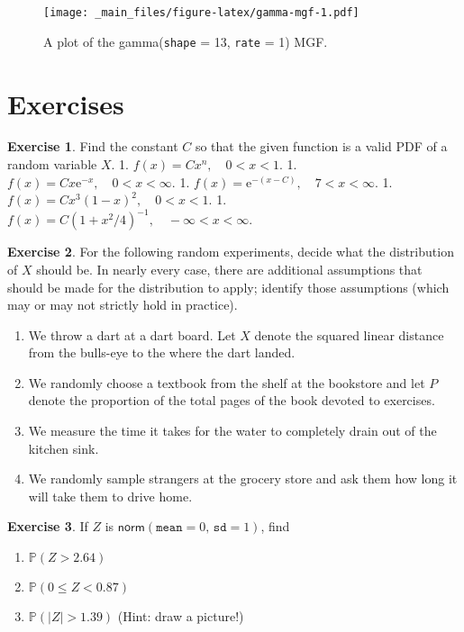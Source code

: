 \documentclass[]{book}
\providecommand{\tightlist}{%
  \setlength{\itemsep}{0pt}\setlength{\parskip}{0pt}}
\numberwithin{equation}{chapter}
\numberwithin{figure}{chapter}
\theoremstyle{plain}
\theoremstyle{definition}
\newtheorem{xca}{Exercise}[chapter]
\theoremstyle{remark}
\theoremstyle{definition}
\theoremstyle{definition}
\theoremstyle{remark}
\begin{document}
\begin{figure}[htbp]
\centering
\texttt{[image: \_main\_files/figure-latex/gamma-mgf-1.pdf]}
\caption{\label{fig:gamma-mgf}\small A plot of the \textsf{gamma}(\texttt{shape} =
13, \texttt{rate} = 1) MGF.}
\end{figure}




\section{Exercises}\label{exercises-4}

\begin{xca}
Find the constant \(C\) so that the given function is a valid PDF of a
random variable \(X\). 1. \(f(x) = Cx^{n},\quad 0 < x <1\). 1.
\(f(x) = Cx\mathrm{e}^{-x},\quad 0 < x < \infty\). 1.
\(f(x) = \mathrm{e}^{-(x - C)}, \quad 7 < x < \infty.\) 1.
\(f(x) = Cx^{3}(1 - x)^{2},\quad 0 < x < 1.\) 1.
\(f(x) = C(1 + x^{2}/4)^{-1}, \quad -\infty < x < \infty.\)
\end{xca}

\bigskip

\begin{xca}
For the following random experiments, decide what the distribution of
\(X\) should be. In nearly every case, there are additional assumptions
that should be made for the distribution to apply; identify those
assumptions (which may or may not strictly hold in practice).

\begin{enumerate}
\def\labelenumi{\arabic{enumi}.}
\tightlist
\item
  We throw a dart at a dart board. Let \(X\) denote the squared linear
  distance from the bulls-eye to the where the dart landed.
\item
  We randomly choose a textbook from the shelf at the bookstore and let
  \(P\) denote the proportion of the total pages of the book devoted to
  exercises.
\item
  We measure the time it takes for the water to completely drain out of
  the kitchen sink.
\item
  We randomly sample strangers at the grocery store and ask them how
  long it will take them to drive home.
\end{enumerate}
\end{xca}

\bigskip

\begin{xca}
If \(Z\) is \(\mathsf{norm}(\mathtt{mean} = 0,\,\mathtt{sd} = 1)\), find

\begin{enumerate}
\def\labelenumi{\arabic{enumi}.}
\tightlist
\item
  \(\mathbb{P}(Z > 2.64)\)
\item
  \(\mathbb{P}(0 \leq Z < 0.87)\)
\item
  \(\mathbb{P}(|Z| > 1.39)\) (Hint: draw a picture!)
\end{enumerate}
\end{xca}
\end{document}
